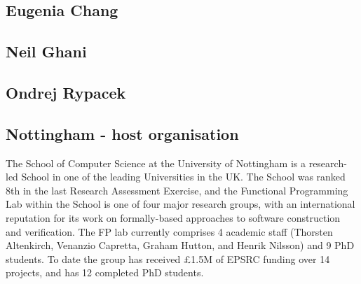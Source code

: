 \documentclass[twocolumn,a4paper,11pt]{article}
\begin{document}
{%



\subsection*{Eugenia Chang}

\subsection*{Neil Ghani}

\subsection*{Ondrej Rypacek}

\subsection*{Nottingham - host organisation}

The School of Computer Science at the University of Nottingham
is a research-led School in one of the leading Universities in
the UK. The School was ranked 8th in the last Research Assessment
Exercise, and the Functional Programming Lab within the School is
one of four major research groups, with an international reputation
for its work on formally-based approaches to software construction
and verification.  The FP lab currently comprises 4 academic staff
(Thorsten Altenkirch, Venanzio Capretta, Graham Hutton, and Henrik
Nilsson) and 9 PhD students.  To date the
group has received \pounds 1.5M of EPSRC funding over 14 projects,
and has 12 completed PhD students.

}
\end{document}
